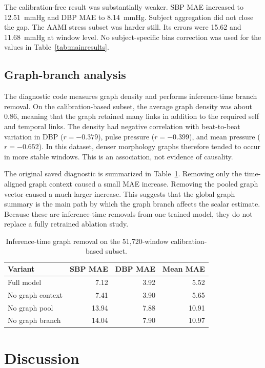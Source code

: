 \documentclass[journal,twoside,web]{ieeecolor}
\begin{document}
The calibration-free result was substantially weaker. SBP MAE increased to 12.51~mmHg and DBP MAE to 8.14~mmHg. Subject aggregation did not close the gap. The AAMI stress subset was harder still. Its errors were 15.62 and 11.68~mmHg at window level. No subject-specific bias correction was used for the values in Table~\ref{tab:mainresults}.

\subsection{Graph-branch analysis}

The diagnostic code measures graph density and performs inference-time branch removal. On the calibration-based subset, the average graph density was about 0.86, meaning that the graph retained many links in addition to the required self and temporal links. The density had negative correlation with beat-to-beat variation in DBP ($r=-0.379$), pulse pressure ($r=-0.399$), and mean pressure ($r=-0.652$). In this dataset, denser morphology graphs therefore tended to occur in more stable windows. This is an association, not evidence of causality.

The original saved diagnostic is summarized in Table~\ref{tab:ablation}. Removing only the time-aligned graph context caused a small MAE increase. Removing the pooled graph vector caused a much larger increase. This suggests that the global graph summary is the main path by which the graph branch affects the scalar estimate. Because these are inference-time removals from one trained model, they do not replace a fully retrained ablation study.

\begin{table}[!t]
\caption{Inference-time graph removal on the 51,720-window calibration-based subset.}
\label{tab:ablation}
\centering
\begin{tabular}{lrrr}
\toprule
Variant & SBP MAE & DBP MAE & Mean MAE \\
\midrule
Full model & 7.12 & 3.92 & 5.52 \\
No graph context & 7.41 & 3.90 & 5.65 \\
No graph pool & 13.94 & 7.88 & 10.91 \\
No graph branch & 14.04 & 7.90 & 10.97 \\
\bottomrule
\end{tabular}
\end{table}

\section{Discussion}\label{sec:discussion}
\end{document}
